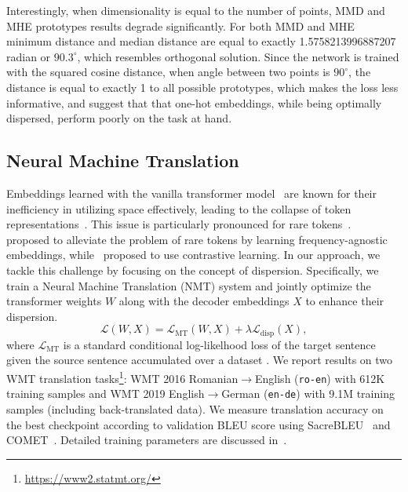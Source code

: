 \documentclass[10pt]{article} %
\newcommand{\langpair}[2]{\texttt{#1-#2}}
\begin{document}
Interestingly, when dimensionality is equal to the number of points, MMD and MHE prototypes results degrade significantly. For both MMD and MHE minimum distance and median distance are equal to exactly 1.5758213996887207 radian or $90.3^\circ$, which resembles orthogonal solution. Since the network is trained with the squared cosine distance, when angle between two points is $90^\circ$, the distance is equal to exactly 1 to all possible prototypes, which makes the loss less informative, 
and \citet{mettes2019hyperspherical} suggest that
that one-hot embeddings, while being optimally dispersed, 
perform poorly on the task at hand.



\subsection{Neural Machine Translation}
Embeddings learned with the vanilla transformer model~\citep{Vaswani-trafo} are known for their inefficiency in utilizing space effectively, leading to the collapse of token representations~\citep{gao2018representation,Wang2020Improving}. This issue is particularly pronounced for rare tokens~\citep{gong2018frage,tokarchuk-niculae-2024-unreasonable,Zhang2022Frequency}. ~\citet{gong2018frage} proposed to alleviate the problem of rare tokens by learning frequency-agnostic embeddings, while~\citet{Zhang2022Frequency} proposed to use contrastive learning. In our approach, we tackle this challenge by focusing on the concept of dispersion. Specifically, we train a Neural Machine Translation (NMT) system and jointly optimize the transformer weights \(W\) along with the decoder embeddings \(X\) to enhance their dispersion. 
\begin{equation}
    \mathcal{L}(W,X)= \mathcal{L}_{\text{MT}}(W,X)+\lambda \mathcal{L}_{\text{disp}}(X),
\end{equation}
where \(\mathcal{L}_\text{MT}\) is a standard conditional log-likelhood loss of the target sentence given the source sentence accumulated over a dataset \citep[\eg,][]{Bahdanau-attention}.
We report results on two WMT translation tasks\footnote{\url{https://www2.statmt.org/}}: WMT 2016 Romanian$\rightarrow$English (\langpair{ro}{en}) with 612K training samples and WMT 2019 English$\rightarrow$German (\langpair{en}{de}) with 9.1M training samples (including back-translated data). We measure translation accuracy on the best checkpoint according to validation BLEU score using SacreBLEU~\citep{papineni-etal-2002-bleu,post-2018-call} and COMET~\citep{rei-etal-2020-comet}. Detailed training parameters are discussed in~.
\end{document}

